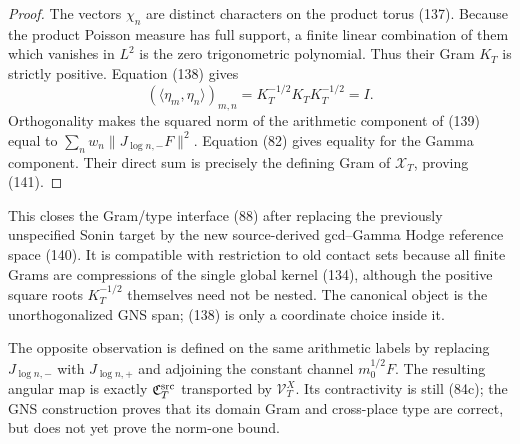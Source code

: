 \documentclass[11pt]{article}
\begin{document}
\begin{proof}
The vectors $\chi_n$ are distinct characters on the product torus (137).
Because the product Poisson measure has full support, a finite linear
combination of them which vanishes in $L^2$ is the zero trigonometric
polynomial.  Thus their Gram $K_T$ is strictly positive.  Equation (138)
gives
\[
 (\langle\eta_m,\eta_n\rangle)_{m,n}
 =K_T^{-1/2}K_TK_T^{-1/2}=I.
\]
Orthogonality makes the squared norm of the arithmetic component of (139)
equal to
$\sum_nw_n\|J_{\log n,-}F\|^2$.  Equation (82) gives equality for the Gamma
component.  Their direct sum is precisely the defining Gram of
$\mathcal X_T$, proving (141).
\end{proof}

This closes the Gram/type interface (88) after replacing the previously
unspecified Sonin target by the new source-derived gcd--Gamma Hodge reference
space (140).  It is compatible with restriction to old contact sets because
all finite Grams are compressions of the single global kernel (134), although
the positive square roots $K_T^{-1/2}$ themselves need not be nested.  The
canonical object is the unorthogonalized GNS span; (138) is only a coordinate
choice inside it.

The opposite observation is defined on the same arithmetic labels by
replacing $J_{\log n,-}$ with $J_{\log n,+}$ and adjoining the constant
channel $m_0^{1/2}F$.  The resulting angular map is exactly
$\mathfrak C_T^{\rm src}$ transported by $\mathcal V_T^X$.  Its
contractivity is still (84c); the GNS construction proves that its domain
Gram and cross-place type are correct, but does not yet prove the norm-one
bound.
\end{document}

